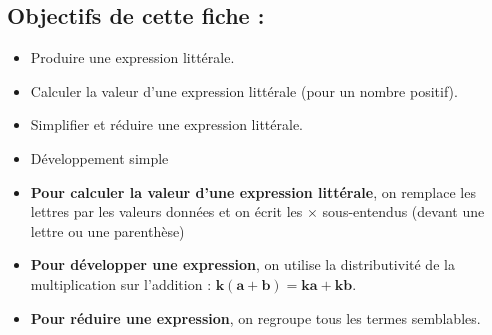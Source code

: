 \renewcommand{\headrulewidth}{1pt}
\fancyhead[L]{}

\renewcommand{\footrulewidth}{1pt}
\fancyfoot[C]{} 
\fancyfoot[L]{}

\subsection*{Objectifs de cette fiche :}
{\setlength{\multicolsep}{0cm}
\setlength{\columnsep}{.2cm}
\setlength{\columnseprule}{0pt}
\vspace{0cm}
	\begin{multicols}{2}
		\begin{itemize}
			\renewcommand{\labelitemi}{\SquareCastShadowBottomRight}
			\item Produire une expression littérale.
			\item Calculer la valeur d'une expression littérale (pour un nombre positif).
			\item Simplifier et réduire une expression littérale.
			\item Développement simple
		\end{itemize}
	\end{multicols}
}

\begin{methode}[frametitle=Méthodes]
\begin{itemize}
	\item \textbf{Pour calculer la valeur d'une expression littérale}, on remplace les lettres par les valeurs données et on écrit les $\times$ sous-entendus (devant une lettre ou une parenthèse)
	
	\item \textbf{Pour développer une expression}, on utilise la distributivité de la multiplication sur l'addition : $\mathbf{k(a+b)=ka+kb}$.
	
	\item \textbf{Pour réduire une expression}, on regroupe tous les termes semblables.	
\end{itemize}

\end{methode}



